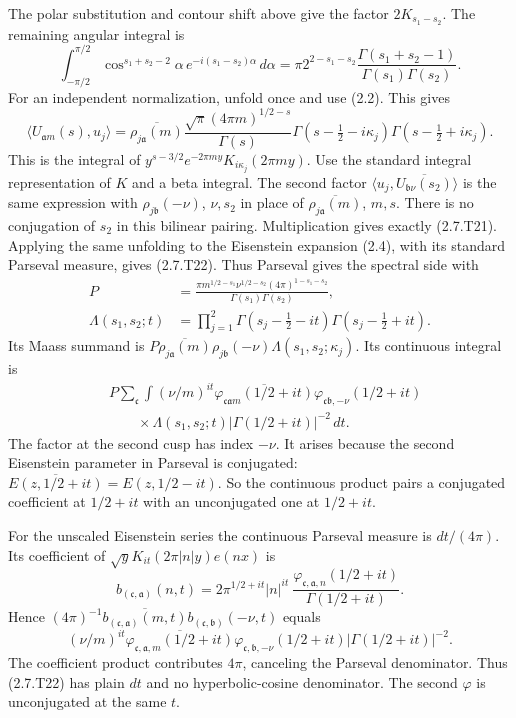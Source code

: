The polar substitution and contour shift above give
the factor $2K_{s_1-s_2}$. The remaining angular integral is
\[
\int_{-\pi/2}^{\pi/2}\cos^{s_1+s_2-2}\alpha\,
 e^{-i(s_1-s_2)\alpha}\,d\alpha
 =\pi2^{2-s_1-s_2}
   \frac{\Gamma(s_1+s_2-1)}{\Gamma(s_1)\Gamma(s_2)}.
\tag{2.7.T20}\label{p1:eq:2.7.T20}
\]
For an independent normalization, unfold once and use (2.2). This gives
\[
\langle U_{\mathfrak a m}(s),u_j\rangle
 =\overline{\rho_{j\mathfrak a}(m)}
 \frac{\sqrt\pi(4\pi m)^{1/2-s}}{\Gamma(s)}
 \Gamma(s-\tfrac12-i\kappa_j)\Gamma(s-\tfrac12+i\kappa_j).
\]
This is the integral of $y^{s-3/2}e^{-2\pi my}K_{i\kappa_j}(2\pi my)$. Use the standard integral representation of $K$ and a beta integral. The second factor
$\langle u_j,\overline{U_{\mathfrak b\nu}(s_2)}\rangle$
is the same expression with $\rho_{j\mathfrak b}(-\nu)$,
$\nu,s_2$ in place of $\overline{\rho_{j\mathfrak a}(m)}$,
$m,s$. There is no conjugation of $s_2$ in this bilinear
pairing. Multiplication gives exactly (2.7.T21). Applying the same
unfolding to the Eisenstein expansion (2.4), with its standard
Parseval measure, gives (2.7.T22). Thus Parseval gives the spectral side with
\[
\begin{aligned}
P&=\frac{\pi m^{1/2-s_1}\nu^{1/2-s_2}(4\pi)^{1-s_1-s_2}}
          {\Gamma(s_1)\Gamma(s_2)},\\
\Lambda(s_1,s_2;t)&=
 \prod_{j=1}^2\Gamma(s_j-\tfrac12-it)\Gamma(s_j-\tfrac12+it).
\end{aligned}
\tag{2.7.T21}\label{p1:eq:2.7.T21}
\]
Its Maass summand is
$P\overline{\rho_{j\mathfrak a}(m)}
\rho_{j\mathfrak b}(-\nu)\Lambda(s_1,s_2;\kappa_j)$.
Its continuous integral is
\[
\begin{split}
&P\sum_{\mathfrak c}\int
 (\nu/m)^{it}\overline{\varphi_{\mathfrak c\mathfrak a m}(1/2+it)}
 \varphi_{\mathfrak c\mathfrak b,-\nu}(1/2+it)\\
&\qquad\times\Lambda(s_1,s_2;t)|\Gamma(1/2+it)|^{-2}\,dt.
\end{split}
\tag{2.7.T22}\label{p1:eq:2.7.T22}
\]
The factor at the second cusp has index $-\nu$. It arises because
the second Eisenstein parameter in Parseval is conjugated:
$\overline{E(z,1/2+it)}=E(z,1/2-it)$. So the continuous
product pairs a conjugated coefficient at $1/2+it$ with an unconjugated one at $1/2+it$.

For the unscaled Eisenstein series the continuous Parseval measure is
$dt/(4\pi)$. Its coefficient of
$\sqrt yK_{it}(2\pi|n|y)e(nx)$ is
\[
b_{(\mathfrak c,\mathfrak a)}(n,t)=
2\pi^{1/2+it}|n|^{it}\
\frac{\varphi_{\mathfrak c,\mathfrak a,n}(1/2+it)}
     {\Gamma(1/2+it)}.
\]
Hence $(4\pi)^{-1}\overline{b_{(\mathfrak c,\mathfrak a)}(m,t)}
b_{(\mathfrak c,\mathfrak b)}(-\nu,t)$ equals
\[
(\nu/m)^{it}
\overline{\varphi_{\mathfrak c,\mathfrak a,m}(1/2+it)}
\varphi_{\mathfrak c,\mathfrak b,-\nu}(1/2+it)
|\Gamma(1/2+it)|^{-2}.
\]
The coefficient product contributes $4\pi$, canceling the
Parseval denominator. Thus (2.7.T22) has plain $dt$ and no hyperbolic-cosine denominator. The second $\varphi$ is unconjugated at the same $t$.

